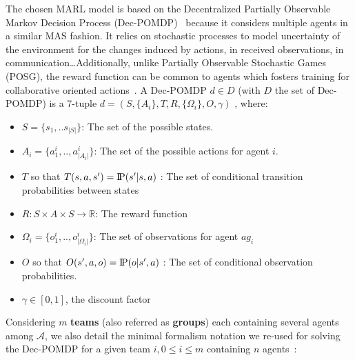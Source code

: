\documentclass{ecai}
\newcommand{\probP}{\text{I\kern-0.15em P}}
\begin{document}
The chosen MARL model is based on the Decentralized Partially Observable Markov Decision Process (Dec-POMDP)~\citep{Oliehoek2016} because it considers multiple agents in a similar MAS fashion. It relies on stochastic processes to model uncertainty of the environment for the changes induced by actions, in received observations, in communication\dots Additionally, unlike Partially Observable Stochastic Games (POSG), the reward function can be common to agents which fosters training for collaborative oriented actions~\citep{Beynier2013}.
A Dec-POMDP $d \in D$ (with $D$ the set of Dec-POMDP) is a 7-tuple $d = (S,\{A_i\},T,R,\{\Omega_i\},O,\gamma)$ , where:
\begin{itemize}
    \item $S = \{s_1, ..s_{|S|}\}$: The set of the possible states.
    \item $A_{i} = \{a_{1}^{i},..,a_{|A_{i}|}^{i}\}$: The set of the possible actions for agent $i$.
    \item $T$ so that $T(s,a,s') = \probP{(s'|s,a)}$ : The set of conditional transition probabilities between states
    \item $R: S \times A \times S \rightarrow \mathbb{R}$: The reward function
    \item $\Omega_{i} = \{o_{1}^{i},..,o_{|\Omega_{i}|}^{i}\}$: The set of observations for agent $ag_i$
    \item $O$ so that $O(s',a,o) = \probP{(o|s',a)}$ : The set of conditional observation probabilities.
    \item $\gamma \in [0,1]$, the discount factor
\end{itemize}

Considering $m$ \textbf{teams} (also referred as \textbf{groups}) each containing several agents among $\mathcal{A}$, we also detail the minimal formalism notation we re-used for solving the Dec-POMDP for a given team $i, 0 \leq i \leq m$ containing $n$ agents~\citep{Beynier2013,Albrecht2024}:
\end{document}

